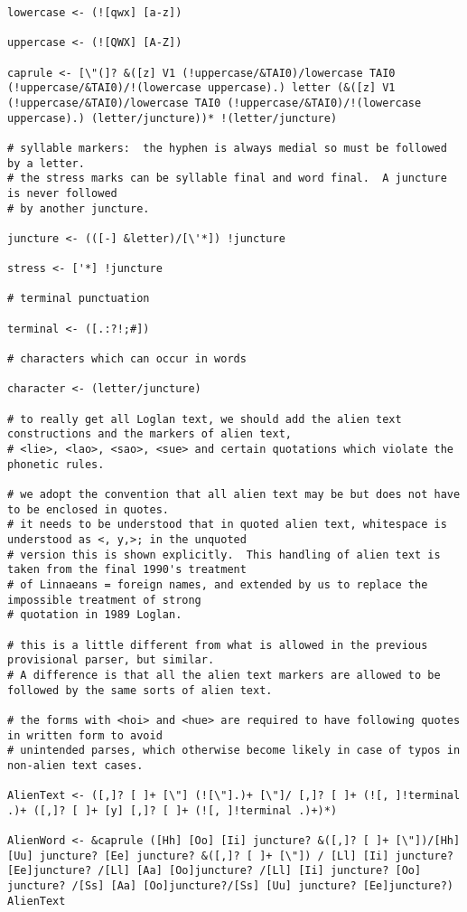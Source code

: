 \documentclass[12pt]{book}
\begin{document}
{\begin{verbatim}
lowercase <- (![qwx] [a-z])

uppercase <- (![QWX] [A-Z])

caprule <- [\"(]? &([z] V1 (!uppercase/&TAI0)/lowercase TAI0 (!uppercase/&TAI0)/!(lowercase uppercase).) letter (&([z] V1 (!uppercase/&TAI0)/lowercase TAI0 (!uppercase/&TAI0)/!(lowercase uppercase).) (letter/juncture))* !(letter/juncture)

# syllable markers:  the hyphen is always medial so must be followed by a letter.
# the stress marks can be syllable final and word final.  A juncture is never followed
# by another juncture.

juncture <- (([-] &letter)/[\'*]) !juncture

stress <- ['*] !juncture

# terminal punctuation

terminal <- ([.:?!;#])

# characters which can occur in words

character <- (letter/juncture)

# to really get all Loglan text, we should add the alien text constructions and the markers of alien text,
# <lie>, <lao>, <sao>, <sue> and certain quotations which violate the phonetic rules.

# we adopt the convention that all alien text may be but does not have to be enclosed in quotes.
# it needs to be understood that in quoted alien text, whitespace is understood as <, y,>; in the unquoted
# version this is shown explicitly.  This handling of alien text is taken from the final 1990's treatment
# of Linnaeans = foreign names, and extended by us to replace the impossible treatment of strong
# quotation in 1989 Loglan.

# this is a little different from what is allowed in the previous provisional parser, but similar.
# A difference is that all the alien text markers are allowed to be followed by the same sorts of alien text.

# the forms with <hoi> and <hue> are required to have following quotes in written form to avoid
# unintended parses, which otherwise become likely in case of typos in non-alien text cases.

AlienText <- ([,]? [ ]+ [\"] (![\"].)+ [\"]/ [,]? [ ]+ (![, ]!terminal .)+ ([,]? [ ]+ [y] [,]? [ ]+ (![, ]!terminal .)+)*)

AlienWord <- &caprule ([Hh] [Oo] [Ii] juncture? &([,]? [ ]+ [\"])/[Hh][Uu] juncture? [Ee] juncture? &([,]? [ ]+ [\"]) / [Ll] [Ii] juncture? [Ee]juncture? /[Ll] [Aa] [Oo]juncture? /[Ll] [Ii] juncture? [Oo] juncture? /[Ss] [Aa] [Oo]juncture?/[Ss] [Uu] juncture? [Ee]juncture?) AlienText


\end{verbatim}}
\end{document}

